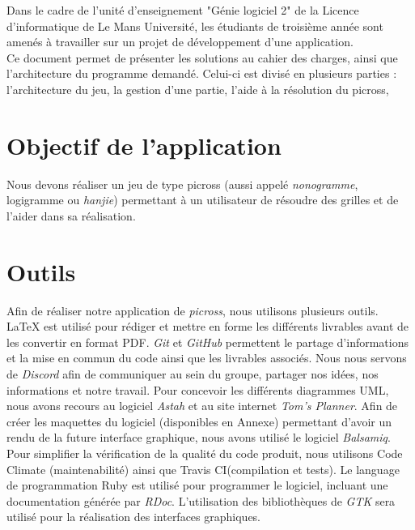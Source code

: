 \documentclass{report}
\begin{document}
		Dans le cadre de l'unité d'enseignement "Génie logiciel 2" de la Licence d'informatique de Le Mans Université, les étudiants de troisième année sont amenés à travailler sur un projet de développement d'une application. \\
		Ce document permet de présenter les solutions au cahier des charges, ainsi que l'architecture du programme demandé. Celui-ci est divisé en plusieurs parties : l’architecture du jeu, la gestion d'une partie, l'aide à la résolution du picross, %

	
 	\section{Objectif de l'application}		
		Nous devons réaliser un jeu de type picross (aussi appelé \textit{nonogramme}, logigramme ou \textit{hanjie}) permettant à un utilisateur de résoudre des grilles et de l'aider dans sa réalisation.
		
	\section{Outils}
		
		Afin de réaliser notre application de \textit{picross}, nous utilisons plusieurs outils.
LaTeX est utilisé pour rédiger et mettre en forme les différents livrables avant de les convertir en format PDF.
\textit{Git} et \textit{GitHub} permettent le partage d'informations et la mise en commun du code ainsi que les livrables associés. Nous nous servons de \textit{Discord} afin de communiquer au sein du groupe, partager nos idées, nos informations et notre travail.
Pour concevoir les différents diagrammes UML, nous avons recours au logiciel \textit{Astah} et au site internet \textit{Tom's Planner}.
Afin de créer les maquettes du logiciel (disponibles en Annexe) permettant d’avoir un rendu de la future interface graphique, nous avons utilisé le logiciel \textit{Balsamiq}.
Pour simplifier la vérification de la qualité du code produit, nous utilisons Code Climate (maintenabilité) ainsi que Travis CI(compilation et tests).
Le language de programmation Ruby est utilisé pour programmer le logiciel, incluant une documentation générée par \textit{RDoc}. L’utilisation des bibliothèques de \textit{GTK} sera utilisé pour la réalisation des interfaces graphiques.

		
\end{document}
